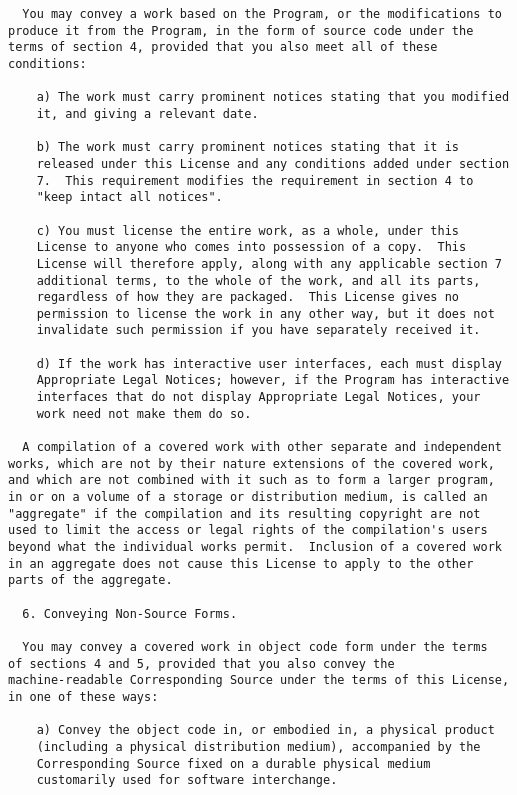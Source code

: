 \documentclass[11pt]{article}
\begin{document}
\begin{verbatim}
  You may convey a work based on the Program, or the modifications to
produce it from the Program, in the form of source code under the
terms of section 4, provided that you also meet all of these conditions:

    a) The work must carry prominent notices stating that you modified
    it, and giving a relevant date.

    b) The work must carry prominent notices stating that it is
    released under this License and any conditions added under section
    7.  This requirement modifies the requirement in section 4 to
    "keep intact all notices".

    c) You must license the entire work, as a whole, under this
    License to anyone who comes into possession of a copy.  This
    License will therefore apply, along with any applicable section 7
    additional terms, to the whole of the work, and all its parts,
    regardless of how they are packaged.  This License gives no
    permission to license the work in any other way, but it does not
    invalidate such permission if you have separately received it.

    d) If the work has interactive user interfaces, each must display
    Appropriate Legal Notices; however, if the Program has interactive
    interfaces that do not display Appropriate Legal Notices, your
    work need not make them do so.

  A compilation of a covered work with other separate and independent
works, which are not by their nature extensions of the covered work,
and which are not combined with it such as to form a larger program,
in or on a volume of a storage or distribution medium, is called an
"aggregate" if the compilation and its resulting copyright are not
used to limit the access or legal rights of the compilation's users
beyond what the individual works permit.  Inclusion of a covered work
in an aggregate does not cause this License to apply to the other
parts of the aggregate.

  6. Conveying Non-Source Forms.

  You may convey a covered work in object code form under the terms
of sections 4 and 5, provided that you also convey the
machine-readable Corresponding Source under the terms of this License,
in one of these ways:

    a) Convey the object code in, or embodied in, a physical product
    (including a physical distribution medium), accompanied by the
    Corresponding Source fixed on a durable physical medium
    customarily used for software interchange.


\end{verbatim}
\end{document}
